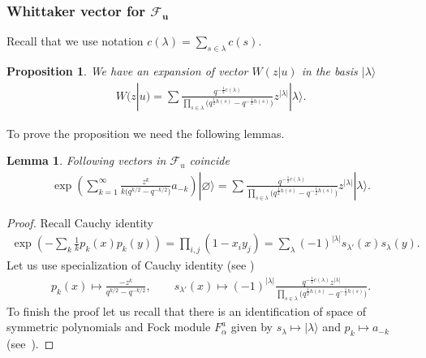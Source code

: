\documentclass[pdftex]{sigma}
\numberwithin{equation}{section}
\newtheorem{Proposition}[Theorem]{Proposition}
\newtheorem{Lemma}[Theorem]{Lemma}
\theoremstyle{definition}
\begin{document}
\subsubsection[Whittaker vector for $\mathcal{F}_u$]{Whittaker vector for $\boldsymbol{\mathcal{F}_u}$} \label{sssec: Whit in 1Fock}

Recall that we use notation $c(\lambda) = \sum\limits_{s \in \lambda} c(s)$.
\begin{Proposition} \label{prop: Whittaker Shur}
We have an expansion of vector $W(z|u)$ in the basis $|\lambda\rangle$
\begin{gather}\label{eq:W:inlambda}
W(z|u) = \sum \frac{q^{-\frac12c(\lambda)} }{\prod\limits_{s\in\lambda}\big(q^{\frac12h(s)}-q^{-\frac12h(s)}\big)} z^{| \lambda |} |\lambda\rangle.
\end{gather}
\end{Proposition}

To prove the proposition we need the following lemmas.

\begin{Lemma} \label{lemma: Whittaker Cond 1}
Following vectors in $\mathcal{F}_u$ coincide
\begin{gather}
\exp\left(\sum_{k=1}^\infty \frac{z^k}{k\big(q^{k/2}-q^{-k/2}\big)}a_{-k}\right)|\varnothing\rangle =\sum \frac{q^{-\frac12c(\lambda)} }{\prod\limits_{s\in\lambda}\big(q^{\frac12h(s)}-q^{-\frac12h(s)}\big)} z^{| \lambda |} |\lambda\rangle.
\label{eq:lemma: Whittaker Cond 1}
\end{gather}
\end{Lemma}

\begin{proof}
Recall Cauchy identity
\begin{gather*}
\exp \left( -\sum_k \frac1kp_k(x)p_k(y) \right)=\prod_{i,j}(1-x_iy_j )=\sum_{\lambda} (-1)^{|\lambda|} s_{\lambda'}(x)s_\lambda(y).
\end{gather*}
Let us use specialization of Cauchy identity (see \cite[Section~1.4, Example~2]{M})
\begin{gather*}p_k(x) \mapsto \frac{-z^k}{q^{k/2}-q^{-k/2}}, \qquad s_{\lambda'}(x) \mapsto (-1)^{|\lambda|} \frac{q^{-\frac12c(\lambda)} z^{|\lambda|}}{\prod\limits_{s\in\lambda}\big(q^{\frac12h(s)}-q^{-\frac12h(s)}\big)}.
\end{gather*}
To finish the proof let us recall that there is an identification of space of symmetric polynomials and Fock module $F^a_{\alpha}$ given by $s_{\lambda} \mapsto | \lambda \rangle$ and $p_k \mapsto a_{-k}$ (see~\cite{KR}).
\end{proof}
\end{document}
